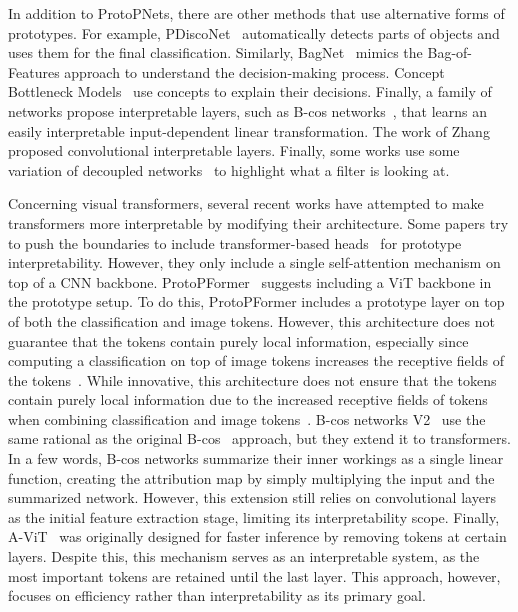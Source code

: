 In addition to ProtoPNets, there are other methods that use alternative forms of prototypes. 
For example, PDiscoNet~\cite{van2023pdisconet} automatically detects parts of objects and uses them for the final classification. Similarly, BagNet~\cite{brendel2018approximating} mimics the Bag-of-Features approach to understand the decision-making process. 
Concept Bottleneck Models~\cite{pmlr-v119-koh20a,oikarinen2023labelfree} use concepts to explain their decisions.
Finally, a family of networks propose interpretable layers, such as B-cos networks~\cite{Boehle2022CVPR}, that learns an easily interpretable input-dependent linear transformation. 
The work of Zhang~\etal~\cite{zhang2018interpretable} proposed convolutional interpretable layers. 
Finally, some works use some variation of decoupled networks~\cite{liang2020training,Li2019InterpretableNN,shen2021interpretable} to highlight what a filter is looking at.



Concerning visual transformers, several recent works have attempted to make transformers more interpretable by modifying their architecture. Some papers try to push the boundaries to include transformer-based heads~\cite{hong2024concept,Paul2023ASI,rigotti2022attentionbased,pmlr-v162-kim22g} for prototype interpretability. However, they only include a single self-attention mechanism on top of a CNN backbone.  ProtoPFormer~\cite{Xue2022ProtoPFormerCO} suggests including a ViT backbone in the prototype setup. To do this, ProtoPFormer includes a prototype layer on top of both the classification and image tokens. However, this architecture does not guarantee that the tokens contain purely local information, especially since computing a classification on top of image tokens increases the receptive fields of the tokens~\cite{raghu2021do}. While innovative, this architecture does not ensure that the tokens contain purely local information due to the increased receptive fields of tokens when combining classification and image tokens~\cite{raghu2021do}. B-cos networks V2~\cite{Boehle2024TPAMI} use the same rational as the original B-cos~\cite{Boehle2022CVPR} approach, but they extend it to transformers. In a few words, B-cos networks summarize their inner workings as a single linear function, creating the attribution map by simply multiplying the input and the summarized network. However, this extension still relies on convolutional layers as the initial feature extraction stage, limiting its interpretability scope. %
Finally, A-ViT~\cite{yin2022avit} was originally designed for faster inference by removing tokens at certain layers. Despite this, this mechanism serves as an interpretable system, as the most important tokens are retained until the last layer.  This approach, however, focuses on efficiency rather than interpretability as its primary goal. %


